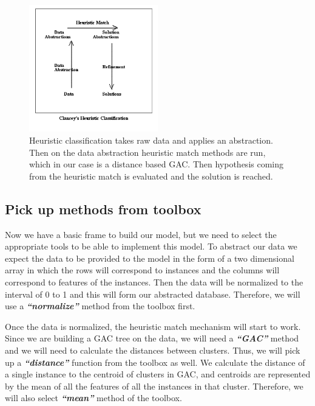 \documentclass[conference]{IEEEtran}
\begin{document}
\begin{figure}
\begin{center}
\includegraphics[width=0.5\textwidth]{heuristic_classification.png}
\end{center}
\caption{Heuristic classification takes raw data and applies an
  abstraction. Then on the data abstraction heuristic match methods
  are run, which in our case is a distance based GAC. Then hypothesis
  coming from the heuristic match is evaluated and the solution is
  reached.}\label{fig:heuristic}
\end{figure}

\subsection{Pick up methods from toolbox}
Now we have a basic frame to build our model, but we need to select
the appropriate tools to be able to implement this model.  To abstract
our data we expect the data to be provided to the model in the form of
a two dimensional array in which the rows will correspond to instances
and the columns will correspond to features of the instances.  Then
the data will be normalized to the interval of 0 to 1 and this will
form our abstracted database.  Therefore, we will use a
\textbf{\textit{``normalize''}} method from the toolbox first.

Once the data is normalized, the heuristic match mechanism will start
to work.  Since we are building a GAC tree on the data, we will need a
\textbf{\textit{``GAC''}} method and we will need to calculate the
distances between clusters.  Thus, we will pick up a
\textbf{\textit{``distance''}} function from the toolbox as well.  We
calculate the distance of a single instance to the centroid of
clusters in GAC, and centroids are represented by the mean of all the
features of all the instances in that cluster.  Therefore, we will
also select \textbf{\textit{``mean''}} method of the toolbox.
\end{document}

